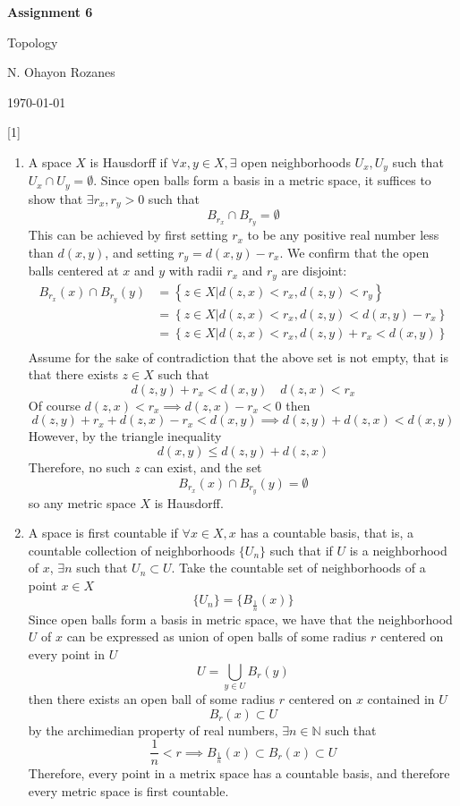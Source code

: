 \documentclass{article} %
\newcommand{\question}[2][]{
  \begin{flushleft}
    \textbf{Question #1}: \textit{#2}

\end{flushleft}}
\newcommand{\maketitletwo}[2][]{
  \begin{center}
    \Large{\textbf{Assignment #1}

    Topology} %
    \vspace{5pt}

    \normalsize{N. Ohayon Rozanes  %

    \today}        %
    \vspace{15pt}

\end{center}}
\begin{document}
\maketitletwo[6]  %

\question[1]{}
\begin{enumerate}
  \item A space $X$ is Hausdorff if $\forall x, y  \in X, \exists$
    open neighborhoods $U_x, U_y$ such that $U_x \cap U_y =
    \emptyset$. Since open balls form a basis in a metric space, it
    suffices to show that $\exists r_x, r_y > 0$ such that
    $$
    B_{r_x} \cap B_{r_y} = \emptyset
    $$
    This can be achieved by first setting $r_x$ to be any positive
    real number less than $d(x,y)$, and setting $r_y = d(x,y) - r_x$.
    We confirm that the open balls centered at $x$ and $y$ with radii
    $r_x$ and $r_y$ are disjoint:
    \begin{align*}
      B_{r_x}(x) \cap B_{r_y}(y) &= \left\{z \in X | d(z, x) < r_x,
      d(z,y) < r_y\right\}\\
      &= \left\{z \in X | d(z, x) < r_x,
      d(z,y) < d(x, y) - r_x\right\}\\
      &= \left\{z \in X | d(z, x) < r_x,
      d(z,y) + r_x < d(x, y) \right\}\\
    \end{align*}
    Assume for the sake of contradiction that the above set is not
    empty, that is that there exists $z \in X$ such that
    \[
      d(z,y) + r_x < d(x,y) \quad d(z,x) < r_x
    \]
    Of course $d(z,x) < r_x \implies d(z,x) - r_x < 0$ then
    \[
      d(z,y) + r_x + d(z,x) - r_x < d(x,y) \implies d(z,y) + d(z,x) < d(x,y)
    \]
    However, by the triangle inequality
    \[
      d(x,y) \leq d(z,y) + d(z,x)
    \]
    Therefore, no such $z$ can exist, and the set
    \[
      B_{r_x}(x) \cap B_{r_y}(y) = \emptyset
    \]
    so any metric space $X$ is Hausdorff.
  \item A space is first countable if $\forall x \in X, x$ has a
    countable basis, that is, a countable collection of neighborhoods
    $\{ U_n \}$ such that if $U$ is a neighborhood of $x$, $\exists n$
    such that $U_n \subset U$.  Take the countable set of
    neighborhoods of a point $x\in X$
    \[
      \{U_n\} = \{ B_{\frac{1}{n}}(x)\}
    \]
    Since open balls form a basis in metric space, we have that the
    neighborhood $U$ of $x$ can be expressed as union of open balls
    of some radius $r$ centered on every point in $U$
    \[
      U = \bigcup_{y \in U} B_r(y)
    \]
    then there exists an open ball of some radius $r$ centered on $x$
    contained in $U$
    $$
    B_r(x) \subset U
    $$
    by the archimedian property of real numbers, $\exists n \in
    \mathbb{N}$ such that
    \[
      \frac{1}{n} < r \implies B_{\frac{1}{n}}(x) \subset B_r(x) \subset U
    \]
    Therefore, every point in a metrix space has a countable basis,
    and therefore every metric space is first countable.

\end{enumerate}
\end{document}
